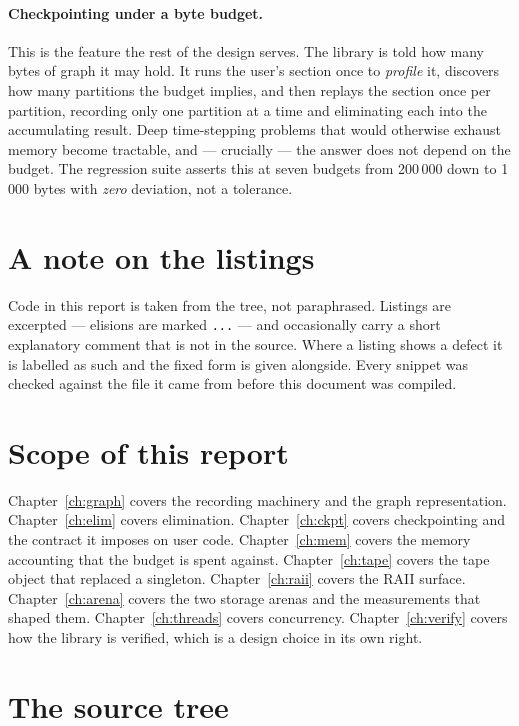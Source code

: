\documentclass[11pt,a4paper]{report}
\newcommand{\code}[1]{\texttt{#1}}
\begin{document}
\paragraph{Checkpointing under a byte budget.} This is the feature the rest of
the design serves. The library is told how many bytes of graph it may hold. It
runs the user's section once to \emph{profile} it, discovers how many partitions
the budget implies, and then replays the section once per partition, recording
only one partition at a time and eliminating each into the accumulating result.
Deep time-stepping problems that would otherwise exhaust memory become
tractable, and --- crucially --- the answer does not depend on the budget. The
regression suite asserts this at seven budgets from 200\,000 down to 1\,000
bytes with \emph{zero} deviation, not a tolerance.

\section{A note on the listings}

Code in this report is taken from the tree, not paraphrased. Listings are
excerpted --- elisions are marked \code{...} --- and occasionally carry a
short explanatory comment that is not in the source. Where a listing shows a
defect it is labelled as such and the fixed form is given alongside. Every
snippet was checked against the file it came from before this document was
compiled.

\section{Scope of this report}

Chapter~\ref{ch:graph} covers the recording machinery and the graph
representation. Chapter~\ref{ch:elim} covers elimination. Chapter~\ref{ch:ckpt}
covers checkpointing and the contract it imposes on user code.
Chapter~\ref{ch:mem} covers the memory accounting that the budget is spent
against. Chapter~\ref{ch:tape} covers the tape object that replaced a
singleton. Chapter~\ref{ch:raii} covers the RAII surface.
Chapter~\ref{ch:arena} covers the two storage arenas and the measurements that
shaped them. Chapter~\ref{ch:threads} covers concurrency.
Chapter~\ref{ch:verify} covers how the library is verified, which is a design
choice in its own right.

\section{The source tree}
\end{document}
